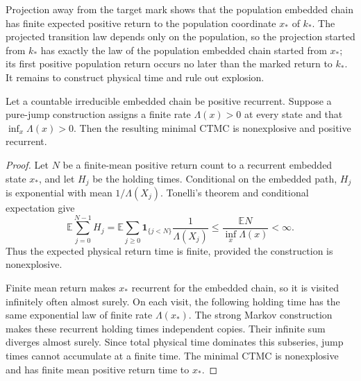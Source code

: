 Projection away from the target mark shows that the population embedded chain
has finite expected positive return to the population coordinate \(x_*\) of
\(k_*\).  The projected transition law depends only on the population, so the
projection started from \(k_*\) has exactly the law of the population embedded
chain started from \(x_*\); its first positive population return occurs no
later than the marked return to \(k_*\).
It remains to construct physical time and rule out explosion.

\begin{proposition}\label{prop:ctmc}
Let a countable irreducible embedded chain be positive recurrent.  Suppose a
pure-jump construction assigns a finite rate \(\Lambda(x)>0\) at every state
and that \(\inf_x\Lambda(x)>0\).  Then the resulting minimal CTMC is
nonexplosive and positive recurrent.
\end{proposition}

\begin{proof}
Let \(N\) be a finite-mean positive return count to a recurrent embedded state
\(x_*\), and let \(H_j\) be the holding times.  Conditional on the embedded
path, \(H_j\) is exponential with mean \(1/\Lambda(X_j)\).  Tonelli's theorem
and conditional expectation give
\[
 \mathbb E\sum_{j=0}^{N-1}H_j
 =\mathbb E\sum_{j\ge0}\mathbf1_{\{j<N\}}
   \frac1{\Lambda(X_j)}
 \le\frac{\mathbb EN}{\inf_x\Lambda(x)}<\infty.
\]
Thus the expected physical return time is finite, provided the construction
is nonexplosive.

Finite mean return makes \(x_*\) recurrent for the embedded chain, so it is
visited infinitely often almost surely.  On each visit, the following
holding time has the same exponential law of finite rate \(\Lambda(x_*)\).
The strong Markov construction makes these recurrent holding times
independent copies.  Their infinite sum diverges almost surely.  Since total
physical time dominates this subseries, jump times cannot accumulate at a
finite time.  The minimal CTMC is nonexplosive and has finite mean positive
return time to \(x_*\).
\end{proof}

